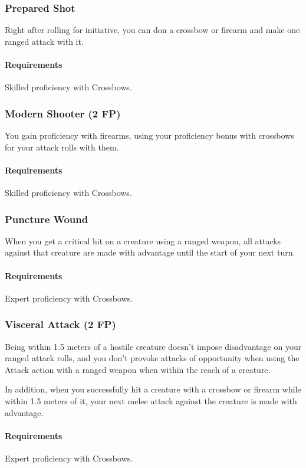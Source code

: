 \subsubsection{Prepared Shot} \label{feat::preparedshot}
    Right after rolling for initiative, you can don a crossbow or firearm and make one ranged attack with it.
    \paragraph{Requirements} Skilled proficiency with Crossbows.
\subsubsection{Modern Shooter (2 FP)} \label{feat::modernshooter}
    You gain proficiency with firearms, using your proficiency bonus with crossbows for your attack rolls with them.
    \paragraph{Requirements} Skilled proficiency with Crossbows.
\subsubsection{Puncture Wound} \label{feat::puncturewound}
    When you get a critical hit on a creature using a ranged weapon, all attacks against that creature are made with advantage until the start of your next turn.
    \paragraph{Requirements} Expert proficiency with Crossbows.
\subsubsection{Visceral Attack (2 FP)} \label{feat::visceralattack}
    Being within 1.5 meters of a hostile creature doesn't impose disadvantage on your ranged attack rolls, and you don't provoke attacks of opportunity when using the Attack action with a ranged weapon when within the reach of a creature.

    In addition, when you successfully hit a creature with a crossbow or firearm while within 1.5 meters of it, your next melee attack against the creature is made with advantage.
    \paragraph{Requirements} Expert proficiency with Crossbows.
